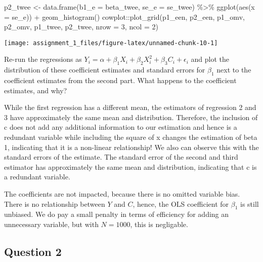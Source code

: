 \documentclass[
]{article}
\newenvironment{Shaded}{\begin{snugshade}}{\end{snugshade}}
\newcommand{\AttributeTok}[1]{\textcolor[rgb]{0.77,0.63,0.00}{#1}}
\newcommand{\DecValTok}[1]{\textcolor[rgb]{0.00,0.00,0.81}{#1}}
\newcommand{\FunctionTok}[1]{\textcolor[rgb]{0.00,0.00,0.00}{#1}}
\newcommand{\NormalTok}[1]{#1}
\newcommand{\OtherTok}[1]{\textcolor[rgb]{0.56,0.35,0.01}{#1}}
\newcommand{\SpecialCharTok}[1]{\textcolor[rgb]{0.00,0.00,0.00}{#1}}
\begin{document}
\begin{Shaded}
\begin{Highlighting}[]
\NormalTok{p2\_twee }\OtherTok{\textless{}{-}} \FunctionTok{data.frame}\NormalTok{(}\AttributeTok{b1\_e =}\NormalTok{ beta\_twee, }
           \AttributeTok{se\_e =}\NormalTok{ se\_twee) }\SpecialCharTok{\%\textgreater{}\%}
    \FunctionTok{ggplot}\NormalTok{(}\FunctionTok{aes}\NormalTok{(}\AttributeTok{x =}\NormalTok{ se\_e)) }\SpecialCharTok{+} \FunctionTok{geom\_histogram}\NormalTok{()}
\NormalTok{cowplot}\SpecialCharTok{::}\FunctionTok{plot\_grid}\NormalTok{(p1\_een, p2\_een,}
\NormalTok{                   p1\_omv, p2\_omv,}
\NormalTok{        p1\_twee, p2\_twee,}
        \AttributeTok{nrow =} \DecValTok{3}\NormalTok{, }\AttributeTok{ncol =} \DecValTok{2}\NormalTok{)}
\end{Highlighting}
\end{Shaded}

\begin{center}\texttt{[image: assignment\_1\_files/figure-latex/unnamed-chunk-10-1]} \end{center}

\normalsize

Re-run the regressions as
\(Y_i = \alpha + \beta_1 X_i + \beta_2 X_i^2 + \beta_3 C_i + \epsilon_i\)
and plot the distribution of these coefficient estimates and standard
errors for \(\beta_1\) next to the coefficient estimates from the second
part. What happens to the coefficient estimates, and why?

While the first regression has a different mean, the estimators of
regression 2 and 3 have approximately the same mean and distribution.
Therefore, the inclusion of c does not add any additional information to
our estimation and hence is a redundant variable while including the
square of x changes the estimation of beta 1, indicating that it is a
non-linear relationship! We also can observe this with the standard
errors of the estimate. The standard error of the second and third
estimator has approximately the same mean and distribution, indicating
that c is a redundant variable.

The coefficients are not impacted, because there is no omitted variable
bias. There is no relationship between \(Y\) and \(C\), hence, the OLS
coefficient for \(\beta_1\) is still unbiased. We do pay a small penalty
in terms of efficiency for adding an unnecessary variable, but with
\(N=1000\), this is negligable.

\hypertarget{question-2}{%
\subsection{Question 2}\label{question-2}}
\end{document}

